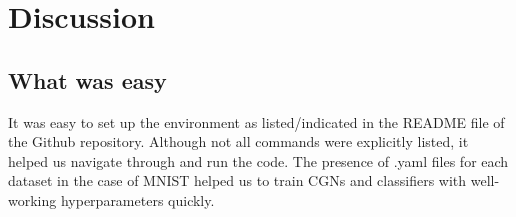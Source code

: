 
\section{Discussion}
\subsection{What was easy}
It was easy to set up the environment as listed/indicated in the README file of the Github repository. Although not all commands were explicitly listed, it helped us navigate through and run the code. The presence of .yaml files for each dataset in the case of MNIST \cite{lecun1998gradient} helped us to train CGNs and classifiers with well-working hyperparameters quickly. 

